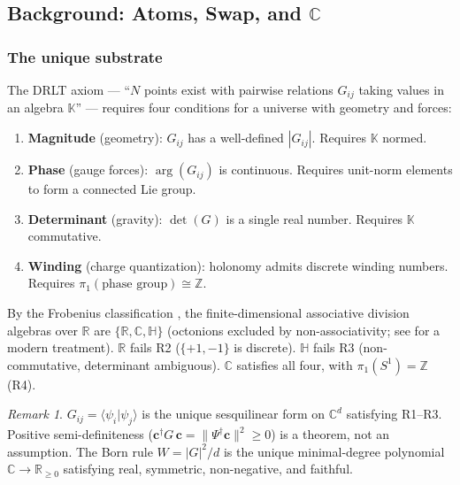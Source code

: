 \documentclass[12pt]{article}
\theoremstyle{remark}
\newtheorem{remark}[theorem]{Remark}
\theoremstyle{definition}
\newcommand{\CC}{\mathbb{C}}
\newcommand{\RR}{\mathbb{R}}
\begin{document}
\subsection{Background: Atoms, Swap, and $\CC$}

\subsubsection{The unique substrate}

The DRLT axiom --- ``$N$ points exist with pairwise relations $G_{ij}$ taking values in an algebra $\mathbb{K}$'' --- requires four conditions for a universe with geometry and forces:

\begin{enumerate}
\item[\textbf{R1.}] \textbf{Magnitude} (geometry): $G_{ij}$ has a well-defined $|G_{ij}|$. Requires $\mathbb{K}$ normed.
\item[\textbf{R2.}] \textbf{Phase} (gauge forces): $\arg(G_{ij})$ is continuous. Requires unit-norm elements to form a connected Lie group.
\item[\textbf{R3.}] \textbf{Determinant} (gravity): $\det(G)$ is a single real number. Requires $\mathbb{K}$ commutative.
\item[\textbf{R4.}] \textbf{Winding} (charge quantization): holonomy admits discrete winding numbers. Requires $\pi_1(\text{phase group}) \cong \mathbb{Z}$.
\end{enumerate}

By the Frobenius classification \cite{Frobenius, Hurwitz}, the
finite-dimensional associative division algebras over $\RR$ are
$\{\RR, \CC, \mathbb{H}\}$ (octonions excluded by
non-associativity; see \cite{Baez} for a modern treatment). $\RR$ fails R2 ($\{+1,-1\}$ is discrete). $\mathbb{H}$ fails R3 (non-commutative, determinant ambiguous). $\CC$ satisfies all four, with $\pi_1(S^1) = \mathbb{Z}$ (R4).

\begin{remark}
$G_{ij} = \langle\psi_i|\psi_j\rangle$ is the unique sesquilinear form on $\CC^d$ satisfying R1--R3. Positive semi-definiteness ($\mathbf{c}^\dagger G\,\mathbf{c} = \|\Psi^\dagger\mathbf{c}\|^2 \geq 0$) is a theorem, not an assumption. The Born rule $W = |G|^2/d$ is the unique minimal-degree polynomial $\CC \to \RR_{\geq 0}$ satisfying real, symmetric, non-negative, and faithful.
\end{remark}
\end{document}
